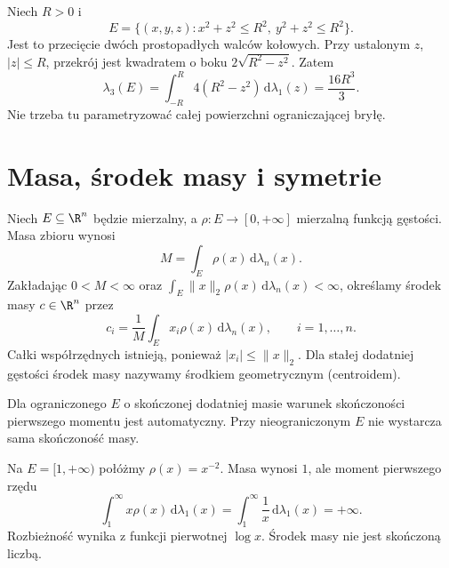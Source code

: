 \begin{przyklad}
\label{ma2:ex:applications-steinmetz}
Niech $R>0$ i
\[
 E=\{(x,y,z):x^2+z^2\le R^2,\ 
                       y^2+z^2\le R^2\}.
\]
Jest to przecięcie dwóch prostopadłych
walców kołowych. Przy ustalonym $z$,
$|z|\le R$, przekrój jest kwadratem
o boku $2\sqrt{R^2-z^2}$. Zatem
\[
 \lambda_3(E)=\int_{-R}^R4(R^2-z^2)\,
 \mathrm d\lambda_1(z)=\frac{16R^3}{3}.
\]
Nie trzeba tu parametryzować całej
powierzchni ograniczającej bryłę.
\end{przyklad}

\section{Masa, środek masy i symetrie}

\begin{definicja}
\label{ma2:def:applications-mass}
Niech $E\subseteq\R^n$ będzie mierzalny,
a $\rho:E\to[0,+\infty]$ mierzalną funkcją
gęstości. Masa zbioru wynosi
\[
 M=\int_E\rho(x)\,\mathrm d\lambda_n(x).
\]
Zakładając $0<M<\infty$ oraz
$\int_E\|x\|_2\rho(x)\,\mathrm d\lambda_n(x)<\infty$,
określamy środek masy $c\in\R^n$ przez
\[
 c_i=\frac1M\int_E x_i\rho(x)\,
 \mathrm d\lambda_n(x),\qquad i=1,\ldots,n.
\]
Całki współrzędnych istnieją, ponieważ
$|x_i|\le\|x\|_2$. Dla stałej dodatniej
gęstości środek masy nazywamy środkiem
geometrycznym (centroidem).
\end{definicja}

Dla ograniczonego $E$ o skończonej dodatniej
masie warunek skończoności pierwszego momentu
jest automatyczny. Przy nieograniczonym $E$
nie wystarcza sama skończoność masy.

\begin{przyklad}
\label{ma2:ex:applications-infinite-first}
Na $E=[1,+\infty)$ połóżmy $\rho(x)=x^{-2}$.
Masa wynosi $1$, ale moment pierwszego rzędu
\[
 \int_1^\infty x\rho(x)\,\mathrm d\lambda_1(x)
 =\int_1^\infty\frac1x\,\mathrm d\lambda_1(x)=+\infty .
\]
Rozbieżność wynika z funkcji pierwotnej $\log x$.
Środek masy nie jest skończoną liczbą.
\end{przyklad}


